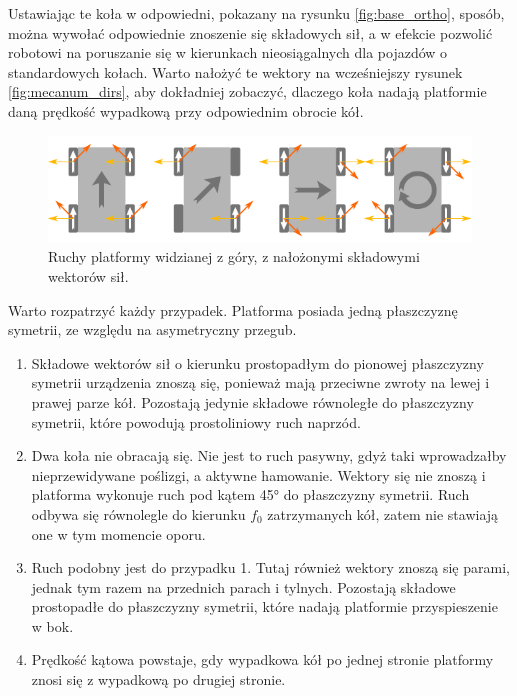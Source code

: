 		Ustawiając te koła w odpowiedni, pokazany na rysunku \ref{fig:base_ortho}, sposób, można wywołać odpowiednie znoszenie się składowych sił,
		a w efekcie pozwolić robotowi na poruszanie się w kierunkach nieosiągalnych dla pojazdów o standardowych kołach.
		Warto nałożyć te wektory na wcześniejszy rysunek \ref{fig:mecanum_dirs}, aby dokładniej zobaczyć, 
		dlaczego koła nadają platformie daną prędkość wypadkową przy odpowiednim obrocie kół.

		\begin{figure}[H]
		\centering
		\includegraphics[width=\textwidth]{graphics/mecanum_dirs_vect.pdf}
		\caption{Ruchy platformy widzianej z góry, z nałożonymi składowymi wektorów sił.}
		\label{fig:mecanum_dirs_vect}
		\end{figure} 

		Warto rozpatrzyć każdy przypadek. Platforma posiada jedną płaszczyznę symetrii, ze względu na asymetryczny przegub.
		\begin{enumerate}
			\item Składowe wektorów sił o kierunku prostopadłym do pionowej płaszczyzny symetrii urządzenia znoszą się, ponieważ mają przeciwne zwroty na lewej i prawej parze kół.
			Pozostają jedynie składowe równoległe do płaszczyzny symetrii, które powodują prostoliniowy ruch naprzód.
			\item Dwa koła nie obracają się. Nie jest to ruch pasywny, gdyż taki wprowadzałby nieprzewidywane poślizgi, a aktywne hamowanie.
			Wektory się nie znoszą i platforma wykonuje ruch pod kątem 45° do płaszczyzny symetrii. Ruch odbywa się równolegle do kierunku $f_0$ zatrzymanych kół,
			zatem nie stawiają one w tym momencie oporu.
			\item Ruch podobny jest do przypadku 1. Tutaj również wektory znoszą się parami, jednak tym razem na przednich parach i tylnych. 
			Pozostają składowe prostopadłe do płaszczyzny symetrii, które nadają platformie przyspieszenie w bok.
			\item Prędkość kątowa powstaje, gdy wypadkowa kół po jednej stronie platformy znosi się z wypadkową po drugiej stronie.
		\end{enumerate}

